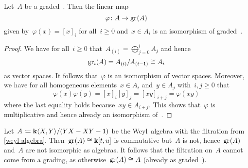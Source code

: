 % 
% 
% 

\begin{lemma}
  Let~$A$ be a graded~{\algebra{$\kf$}}.
  Then the linear map
  \[
    \varphi 
    \colon
    A
    \to
    \gr(A)
  \]
  given by~$\varphi(x) = [x]_i$ for all~$i \geq 0$ and~$x \in A_i$ is an isomorphism of graded~{\algebras{$\kf$}}.
\end{lemma}


\begin{proof}
  We have for all~$i \geq 0$ that~$A_{(i)} = \bigoplus_{j=0}^i A_j$ and hence
  \[
    \gr[i](A)
    =
    A_{(i)} / A_{(i-1)}
    \cong
    A_i
  \]
  as vector spaces.
  It follows that~$\varphi$ is an isomorphism of vector spaces.
  Moreover, we have for all homogeneous elements~$x \in A_i$ and~$y \in A_j$ with~$i, j \geq 0$ that
  \[
    \varphi(x) \varphi(y)
    =
    [x]_i [y]_j
    =
    [xy]_{i+j}
    =
    \varphi(xy)
  \]
  where the last equality holds because~$xy \in A_{i+j}$.
  This shows that~$\varphi$ is multiplicative and hence already an isomorphism of~{\algebras{$\kf$}}.
\end{proof}


\begin{example}
  Let~$A \coloneqq \mathbf{k}\langle X, Y\rangle/(YX - XY - 1)$ be the Weyl~algebra with the filtration from \cref{weyl algebra}.
  Then~$\gr(A) \cong \kf[t,u]$ is commutative but~$A$ is not, hence~$\gr(A)$ and~$A$ are not isomorphic as algebras.
  It follows that the filtration on~$A$ cannot come from a grading, as otherwise~$\gr(A) \cong A$ (already as graded~{\algebras{$\kf$}}).
\end{example}



